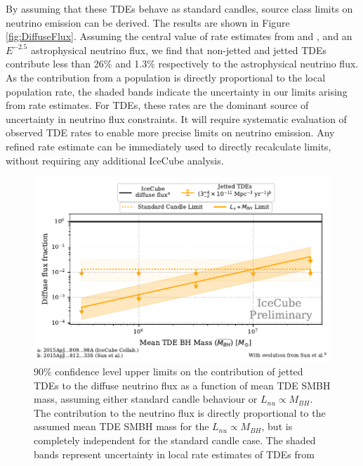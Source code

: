 \documentclass{PoS}
\begin{document}
By assuming that these TDEs behave as standard candles, source class limits on neutrino emission can be derived.  The results are shown in Figure \ref{fig:DiffuseFlux}. Assuming the central value of rate estimates from \cite{vanVelzen:2017qum} and \cite{Sun:2015bda}, and an $E^{-2.5}$ astrophysical neutrino flux, we find that non-jetted and jetted TDEs contribute less than 26\% and 1.3\% respectively to the astrophysical neutrino flux. As the contribution from a population is directly proportional to the local population rate, the shaded bands indicate the uncertainty in our limits arising from rate estimates. For TDEs, these rates are the dominant source of uncertainty in neutrino flux constraints. It will require systematic evaluation of observed TDE rates to enable more precise limits on neutrino emission. Any refined rate estimate can be immediately used to directly recalculate  limits, without requiring any additional IceCube analysis.

\begin{figure}[!ht]
	\centering \includegraphics[width=\textwidth]{figures/diffuse_flux_global_fit_mass.pdf}
	\caption{90\% confidence level upper limits on the contribution of jetted  TDEs to the diffuse neutrino flux \cite{Aartsen:2015knd} as a function of mean TDE SMBH mass, assuming either standard candle behaviour or $L_{nu} \propto M_{BH}$. The contribution to the neutrino flux is directly proportional to the assumed mean TDE SMBH mass for the $L_{nu} \propto M_{BH}$, but is completely independent for the standard candle case. The shaded bands represent uncertainty in local rate estimates of TDEs from \cite{Sun:2015bda}}
	\label{fig:DiffuseFluxMass}
\end{figure}
\end{document}
